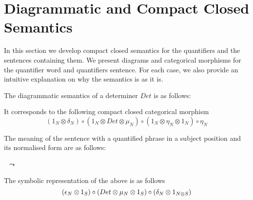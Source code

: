 \section{Diagrammatic and Compact Closed Semantics}


In this section we develop compact closed semantics for the quantifiers and the sentences containing them. We present   diagrams and  categorical morphisms for the quantifier word and quantifiers sentence. For each case, we also provide an intuitive explanation on why the semantics is as it is. 


The diagrammatic semantics of a determiner $Det$ is as follows:

\begin{center}
\end{center}

\noindent
It corresponds to the following compact closed categorical morphism
{\small
\[
(1_N \otimes \delta_N) \circ (1_N \otimes Det \otimes \mu_N) \circ (1_N \otimes \eta_N \otimes 1_N) \circ \eta_N 
\]}

\noindent
The meaning of the sentence with a quantified phrase in a subject position and its normalised form are as follows:


\begin{minipage}{20cm}
\begin{minipage}{7cm}
\end{minipage}
\ $\leadsto$ \
\begin{minipage}{5cm}
\end{minipage}
\end{minipage}


\noindent
The symbolic representation of the above is as follows
\[{\small
(\epsilon_N \otimes 1_S) \circ (Det \otimes  \mu_N \otimes 1_S) \circ (\delta_N \otimes 1_{N \otimes S})}
\]


